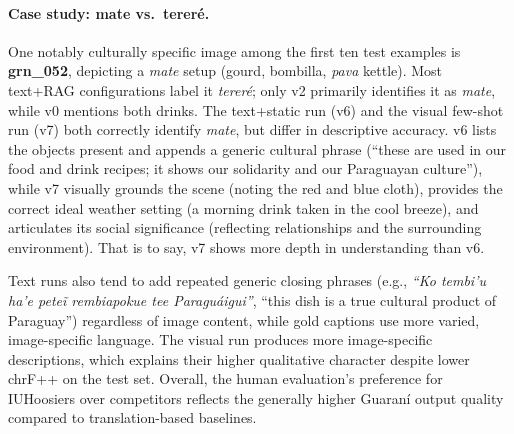 \documentclass[11pt]{article}
\begin{document}
\paragraph{Case study: mate vs.\ tereré.} One notably culturally specific image among the first ten test examples is \textbf{grn\_052}, depicting a \textit{mate} setup (gourd, bombilla, \textit{pava} kettle). Most text+RAG configurations label it \textit{tereré}; only v2 primarily identifies it as \textit{mate}, while v0 mentions both drinks. The text+static run (v6) and the visual few-shot run (v7) both correctly identify \textit{mate}, but differ in descriptive accuracy. v6 lists the objects present and appends a generic cultural phrase (``these are used in our food and drink recipes; it shows our solidarity and our Paraguayan culture''), while v7 visually grounds the scene (noting the red and blue cloth), provides the correct ideal weather setting (a morning drink taken in the cool breeze), and articulates its social significance (reflecting relationships and the surrounding environment). That is to say, v7 shows more depth in understanding than v6.

Text runs also tend to add repeated generic closing phrases
(e.g., \textit{``Ko tembi'u ha'e peteĩ rembiapokue tee Paraguáigui''},
``this dish is a true cultural product of Paraguay'') regardless of image
content, while gold captions use more varied, image-specific language.
The visual run produces more image-specific descriptions, which explains
their higher qualitative character despite lower chrF++ on the test set.
Overall, the human evaluation's preference for IUHoosiers over competitors
reflects the generally higher Guaran\'{i} output quality compared to
translation-based baselines.

\end{document}
